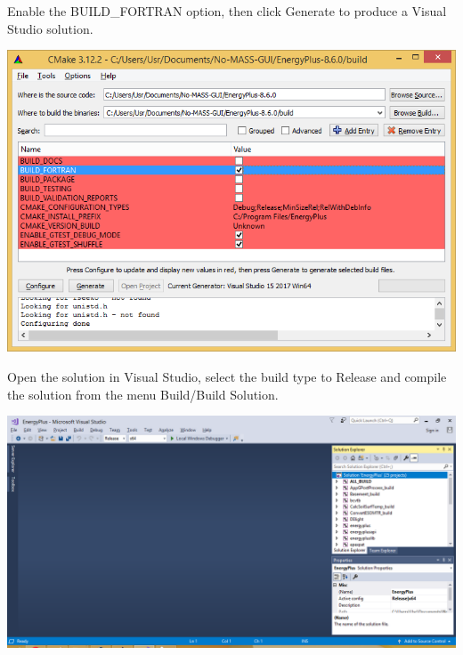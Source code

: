 \begin{DoxyEnumerate}
\item Enable the {\ttfamily B\+U\+I\+L\+D\+\_\+\+F\+O\+R\+T\+R\+AN} option, then click {\ttfamily Generate} to produce a Visual Studio solution. 
\begin{DoxyImage}
\includegraphics[width=15cm]{win_cmake_step3.png}
\end{DoxyImage}
  
\item Open the solution in Visual Studio, select the build type to {\ttfamily Release} and compile the solution from the menu {\ttfamily Build/\+Build Solution}. 
\begin{DoxyImage}
\includegraphics[width=15cm]{vs_compilerelease.png}
\end{DoxyImage}
  

\end{DoxyEnumerate}
